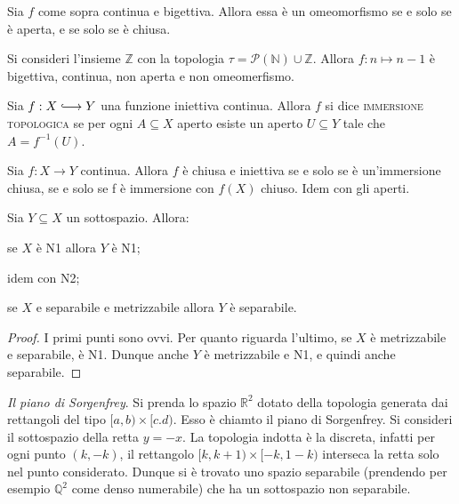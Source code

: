 \begin{oss}
    Sia $f$ come sopra continua e bigettiva. Allora essa \`e un omeomorfismo se
    e solo se \`e aperta, e se solo se \`e chiusa.
\end{oss}

\begin{ex}
    Si consideri l'insieme $\mathbb{Z}$ con la topologia $\tau =
    \mathcal{P}(\mathbb{N})\cup\mathbb{Z}$. Allora $f: n \longmapsto n-1$ \`e
    bigettiva, continua, non aperta e non omeomerfismo.
\end{ex}

\begin{defn}
    Sia $f:X \hooklongrightarrow Y$ una funzione iniettiva continua. Allora $f$
    si dice \textsc{immersione topologica} se per ogni $A \subseteq X$ aperto
    esiste un aperto $U \subseteq Y$ tale che $A = f^{-1}(U)$.
\end{defn}

\begin{oss}
    Sia $f: X \longrightarrow Y$ continua. Allora $f$ \`e chiusa e iniettiva se
    e solo se \`e un'immersione chiusa, se e solo se f \`e immersione con $f(X)$
    chiuso. Idem con gli aperti.
\end{oss}

\begin{oss}
    Sia $Y \subseteq X$ un sottospazio. Allora:
    \begin{nlist}
        \item se $X$ \`e N1 allora $Y$ \`e N1;

        \item idem con N2;

        \item se $X$ e separabile e metrizzabile allora $Y$ \`e separabile.
    \end{nlist}
\end{oss}

\begin{proof}
    I primi punti sono ovvi. Per quanto riguarda l'ultimo, se $X$ \`e
    metrizzabile e separabile, \`e N1. Dunque anche $Y$ \`e metrizzabile e N1, e
    quindi anche separabile.
\end{proof}

\begin{ex} \label{Sorgenfrey-piano}
    \emph{Il piano di Sorgenfrey}. Si prenda lo spazio $\mathbb{R}^2$ dotato
    della topologia generata dai rettangoli del tipo ${[a,b) \times [c.d)}$.
    Esso \`e chiamto il piano di Sorgenfrey. Si consideri il sottospazio della
    retta $y=-x$. La topologia indotta \`e la discreta, infatti per ogni punto
    $(k, -k)$, il rettangolo ${[k, k+1)\times[-k, 1-k)}$ interseca la retta solo
    nel punto considerato. Dunque si \`e trovato uno spazio separabile
    (prendendo per esempio $\mathbb{Q}^2$ come denso numerabile) che ha un
    sottospazio non separabile.
\end{ex}
